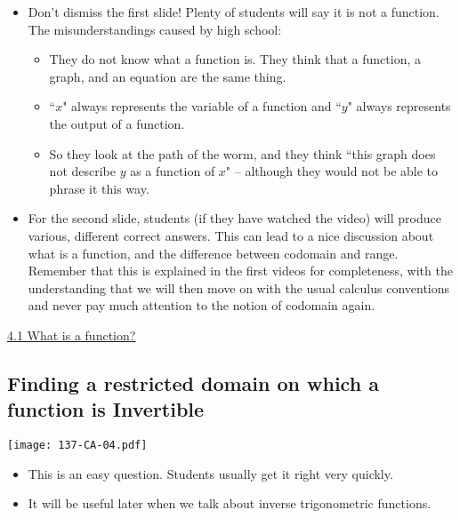\documentclass[11pt]{article}
\newcommand{\nl}{\hfill \vspace{-1.1\baselineskip}} %
\newcommand{\vi}{\hspace{8mm} \href{https://www.youtube.com/watch?v=17lUN_X8vAY&list=PLlwePzQY_wW-EDeUZebRoA8HGoeZxxpEU&index=1}{4.1 What is a function?}}
\begin{document}
\begin{comments}
\nl
\begin{itemize}
	\item   Don't dismiss the first slide!  Plenty of students will say it is not a function.  The misunderstandings caused by high school:
		\begin{itemize}
			\item  They do not know what a function is.  They think that a function, a graph, and an equation are the same thing.
			\item  ``$x$" always represents the variable of a function and ``$y$" always represents the output of a function.
			\item So they look at the path of the worm, and they think ``this graph does not describe $y$ as a function of $x$" -- although they would not be able to phrase it this way.
		\end{itemize}
	\item For the second slide, students (if they have watched the video) will produce various, different correct answers.  This can lead to a nice discussion about what is a function, and the difference between codomain and range.  Remember that this is explained in the first videos for completeness, with the understanding that we will then move on with the usual calculus conventions and never pay much attention to the notion of codomain again.
\end{itemize}	
\end{comments}

\begin{videos}
\vi
\end{videos}

\newpage

\subsection{Finding a restricted domain on which a function is Invertible} 

\begin{center}
{ \texttt{[image: 137-CA-04.pdf]}} 
\end{center}


\begin{comments}
\nl
\begin{itemize}
\item This is an easy question. Students usually get it right very quickly. 
\item It will be useful later when we talk about inverse trigonometric functions.
\end{itemize}	
\end{comments}
\end{document}
